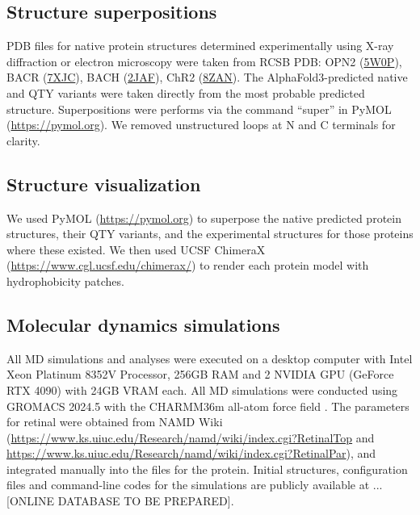 \documentclass[fleqn,10pt,lineno]{manuscript}
\begin{document}
\subsection*{Structure superpositions}

PDB files for native protein structures determined experimentally using X-ray diffraction or electron microscopy were taken from RCSB PDB: OPN2 (\href{https://www.rcsb.org/structure/5W0P}{5W0P}), BACR (\href{https://www.rcsb.org/structure/7XJC}{7XJC}), BACH (\href{https://www.rcsb.org/structure/2JAF}{2JAF}), ChR2 (\href{https://www.rcsb.org/structure/8ZAN}{8ZAN}). The AlphaFold3-predicted native and QTY variants were taken directly from the most probable predicted structure. Superpositions were performs via the command ``super'' in PyMOL (\url{https://pymol.org}). We removed unstructured loops at N and C terminals for clarity. 

\subsection*{Structure visualization}

We used PyMOL (\url{https://pymol.org}) to superpose the native predicted protein structures, their QTY variants, and the experimental structures for those proteins where these existed. We then used UCSF ChimeraX (\url{https://www.cgl.ucsf.edu/chimerax/}) to render each protein model with hydrophobicity patches.  

\subsection*{Molecular dynamics simulations}

All MD simulations and analyses were executed on a desktop computer with Intel Xeon Platinum 8352V Processor, 256GB RAM and 2 NVIDIA GPU (GeForce RTX 4090) with 24GB VRAM each. All MD simulations were conducted using GROMACS 2024.5 \citep{Abraham_2015} with the CHARMM36m all-atom force field \citep{Huang_2017}. The parameters for retinal were obtained from NAMD Wiki (\url{https://www.ks.uiuc.edu/Research/namd/wiki/index.cgi?RetinalTop} and \url{https://www.ks.uiuc.edu/Research/namd/wiki/index.cgi?RetinalPar}), and integrated manually into the files for the protein. Initial structures, configuration files and command-line codes for the simulations are publicly available at ... [ONLINE DATABASE TO BE PREPARED]. 
\end{document}
